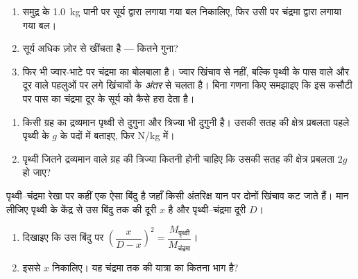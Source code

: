 \begin{exercise}[$\star\star$]\label{exo:g10:universal-gravitation:10}
\begin{enumerate}
  \item समुद्र के \qty{1.0}{kg} पानी पर सूर्य द्वारा लगाया गया बल निकालिए,
        फिर उसी  पर चंद्रमा द्वारा लगाया गया बल।
  \item सूर्य अधिक ज़ोर से खींचता है --- कितने गुना?
  \item फिर भी ज्वार-भाटे पर चंद्रमा का बोलबाला है। ज्वार खिंचाव से
        नहीं, बल्कि पृथ्वी के पास वाले और दूर वाले पहलुओं पर लगे
        खिंचावों के \emph{अंतर} से चलता है। बिना गणना किए समझाइए कि इस
        कसौटी पर पास का चंद्रमा दूर के सूर्य को कैसे हरा देता है।
\end{enumerate}
\end{exercise}

\begin{exercise}[$\star\star$]\label{exo:g10:universal-gravitation:11}
\begin{enumerate}
  \item किसी ग्रह का द्रव्यमान पृथ्वी से दुगुना और त्रिज्या भी दुगुनी
        है। उसकी सतह की क्षेत्र प्रबलता पहले पृथ्वी के $g$ के पदों
        में बताइए, फिर \unit{N/kg} में।
  \item पृथ्वी जितने द्रव्यमान वाले ग्रह की त्रिज्या कितनी होनी चाहिए
        कि उसकी सतह की क्षेत्र प्रबलता $2g$ हो जाए?
\end{enumerate}
\end{exercise}

\begin{exercise}[$\star\star\star$]\label{exo:g10:universal-gravitation:12}
पृथ्वी--चंद्रमा रेखा पर कहीं एक ऐसा बिंदु है जहाँ किसी अंतरिक्ष यान पर
दोनों खिंचाव कट जाते हैं। मान लीजिए पृथ्वी के केंद्र से उस बिंदु तक की
दूरी $x$ है और पृथ्वी--चंद्रमा दूरी $D$।
\begin{enumerate}
  \item दिखाइए कि उस बिंदु पर $\left(\dfrac{x}{D - x}\right)^{2}
        = \dfrac{M_{\text{पृथ्वी}}}{M_{\text{चंद्रमा}}}$।
  \item इससे $x$ निकालिए। यह चंद्रमा तक की यात्रा का कितना भाग है?
\end{enumerate}
\end{exercise}

